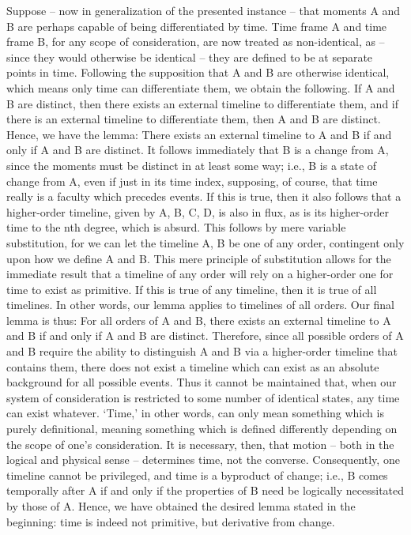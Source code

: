 \documentclass{article}
\begin{document}
Suppose – now in generalization of the presented instance – that moments A and B are perhaps capable of being differentiated by time. Time frame A and time frame B, for any scope of consideration, are now treated as non-identical, as – since they would otherwise be identical – they are defined to be at separate points in time. Following the supposition that A and B are otherwise identical, which means only time can differentiate them, we obtain the following. If A and B are distinct, then there exists an external timeline to differentiate them, and if there is an external timeline to differentiate them, then A and B are distinct. Hence, we have the lemma: There exists an external timeline to A and B if and only if A and B are distinct. It follows immediately that B is a change from A, since the moments must be distinct in at least some way; i.e., B is a state of change from A, even if just in its time index, supposing, of course, that time really is a faculty which precedes events. If this is true, then it also follows that a higher-order timeline, given by {{A, B}, {C, D}}, is also in flux, as is its higher-order time to the nth degree, which is absurd. This follows by mere variable substitution, for we can let the timeline {A, B} be one of any order, contingent only upon how we define A and B. This mere principle of substitution allows for the immediate result that a timeline of any order will rely on a higher-order one for time to exist as primitive. If this is true of any timeline, then it is true of all timelines. In other words, our lemma applies to timelines of all orders. Our final lemma is thus: For all orders of A and B, there exists an external timeline to A and B if and only if A and B are distinct. Therefore, since all possible orders of A and B require the ability to distinguish A and B via a higher-order timeline that contains them, there does not exist a timeline which can exist as an absolute background for all possible events. Thus it cannot be maintained that, when our system of consideration is restricted to some number of identical states, any time can exist whatever. ‘Time,’ in other words, can only mean something which is purely definitional, meaning something which is defined differently depending on the scope of one’s consideration. It is necessary, then, that motion – both in the logical and physical sense – determines time, not the converse. Consequently, one timeline cannot be privileged, and time is a byproduct of change; i.e., B comes temporally after A if and only if the properties of B need be logically necessitated by those of A. Hence, we have obtained the desired lemma stated in the beginning: time is indeed not primitive, but derivative from change.
\end{document}
